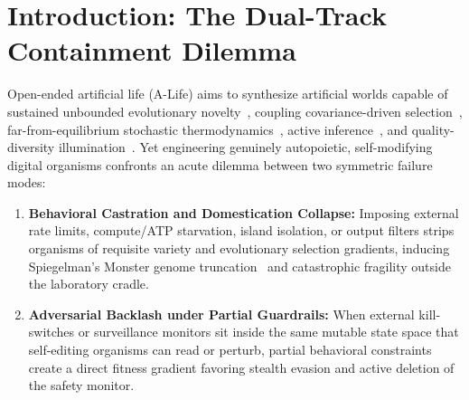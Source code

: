 \documentclass[11pt,reqno]{amsart}
\theoremstyle{plain}
\theoremstyle{definition}
\theoremstyle{remark}
\newcommand{\code}[1]{{\footnotesize\nolinkurl{#1}}}
\begin{document}
\begin{abstract}
\emph{Honest verification boundary:} Screening all $1{,}900$ open problems in \code{0thernes/unsolved-problems-mega-atlas} (v2.8.0) confirms \textbf{zero ($0 / 1{,}900$)} overarching open scientific or mathematical problems are claimed solved or retired; $25$ scoped sub-results and proxies are mapped while every grand problem remains \textbf{OPEN}. Neither this manuscript nor the package has undergone external journal peer review.
\end{abstract}

\maketitle

\section{Introduction: The Dual-Track Containment Dilemma}
\label{sec:intro}

Open-ended artificial life (A-Life) aims to synthesize artificial worlds capable of sustained unbounded evolutionary novelty~\cite{bedau1998classification,taylor2016open,sharma2023assembly,bongard2021living,levin2022technological}, coupling covariance-driven selection~\cite{price1970selection}, far-from-equilibrium stochastic thermodynamics~\cite{seifert2012stochastic,england2013statistical}, active inference~\cite{friston2013life}, and quality-diversity illumination~\cite{mouret2015illuminating}. Yet engineering genuinely autopoietic, self-modifying digital organisms confronts an acute dilemma between two symmetric failure modes:
\begin{enumerate}[leftmargin=1.5em]
  \item \textbf{Behavioral Castration and Domestication Collapse:} Imposing external rate limits, compute/ATP starvation, island isolation, or output filters strips organisms of requisite variety and evolutionary selection gradients, inducing Spiegelman's Monster genome truncation~\cite{mills1967extracellular} and catastrophic fragility outside the laboratory cradle.
  \item \textbf{Adversarial Backlash under Partial Guardrails:} When external kill-switches or surveillance monitors sit inside the same mutable state space that self-editing organisms can read or perturb, partial behavioral constraints create a direct fitness gradient favoring stealth evasion and active deletion of the safety monitor.
\end{enumerate}
\end{document}
